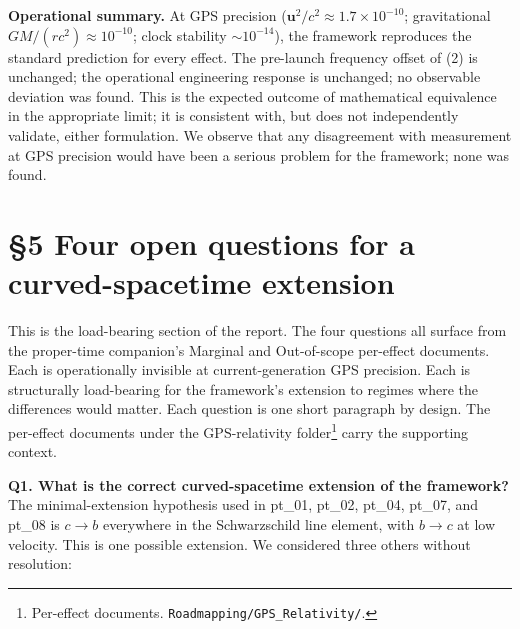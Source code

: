 \documentclass[
  11pt,
]{article}
\begin{document}
\textbf{Operational summary.} At GPS precision
(\(\mathbf{u}^2/c^2 \approx 1.7 \times 10^{-10}\); gravitational
\(GM/(rc^2) \approx 10^{-10}\); clock stability \(\sim 10^{-14}\)), the
framework reproduces the standard prediction for every effect. The
pre-launch frequency offset of (2) is unchanged; the operational
engineering response is unchanged; no observable deviation was found.
This is the expected outcome of mathematical equivalence in the
appropriate limit; it is consistent with, but does not independently
validate, either formulation. We observe that any disagreement with
measurement at GPS precision would have been a serious problem for the
framework; none was found.

\hypertarget{four-open-questions-for-a-curved-spacetime-extension}{%
\section{§5 Four open questions for a curved-spacetime
extension}\label{four-open-questions-for-a-curved-spacetime-extension}}

This is the load-bearing section of the report. The four questions all
surface from the proper-time companion's Marginal and Out-of-scope
per-effect documents. Each is operationally invisible at
current-generation GPS precision. Each is structurally load-bearing for
the framework's extension to regimes where the differences would matter.
Each question is one short paragraph by design. The per-effect documents
under the GPS-relativity folder\footnote{Per-effect documents.
  \texttt{Roadmapping/GPS\_Relativity/}.} carry the supporting context.

\textbf{Q1. What is the correct curved-spacetime extension of the
framework?} The minimal-extension hypothesis used in pt\_01, pt\_02,
pt\_04, pt\_07, and pt\_08 is \(c \to b\) everywhere in the
Schwarzschild line element, with \(b \to c\) at low velocity. This is
one possible extension. We considered three others without resolution:
\end{document}
